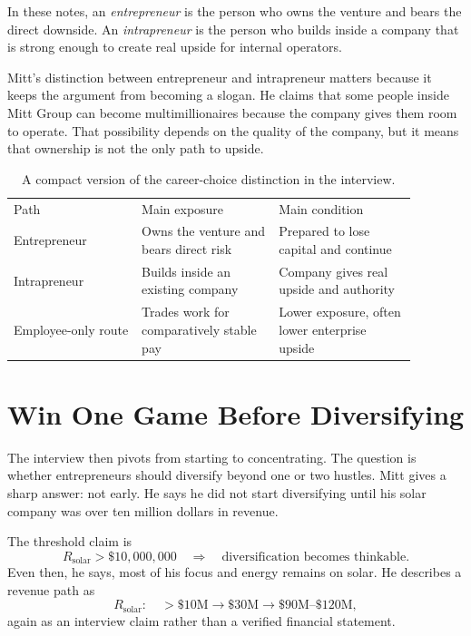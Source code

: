 \begin{definition}
In these notes, an \emph{entrepreneur} is the person who owns the venture and bears the direct downside. An \emph{intrapreneur} is the person who builds inside a company that is strong enough to create real upside for internal operators.
\end{definition}

Mitt's distinction between entrepreneur and intrapreneur matters because it keeps the argument from becoming a slogan. He claims that some people inside Mitt Group can become multimillionaires because the company gives them room to operate. That possibility depends on the quality of the company, but it means that ownership is not the only path to upside.

\begin{table}
\centering
\begin{tabular}{p{0.28\linewidth}p{0.30\linewidth}p{0.30\linewidth}}
Path & Main exposure & Main condition \\
Entrepreneur & Owns the venture and bears direct risk & Prepared to lose capital and continue \\
Intrapreneur & Builds inside an existing company & Company gives real upside and authority \\
Employee-only route & Trades work for comparatively stable pay & Lower exposure, often lower enterprise upside \\
\end{tabular}
\caption{A compact version of the career-choice distinction in the interview.}
\end{table}

\section{Win One Game Before Diversifying}

The interview then pivots from starting to concentrating. The question is whether entrepreneurs should diversify beyond one or two hustles. Mitt gives a sharp answer: not early. He says he did not start diversifying until his solar company was over ten million dollars in revenue.

The threshold claim is
\begin{equation}
R_{\text{solar}} > \$10{,}000{,}000
\quad\Longrightarrow\quad
\text{diversification becomes thinkable}.
\end{equation}
Even then, he says, most of his focus and energy remains on solar. He describes a revenue path as
\begin{equation}
R_{\text{solar}}:\quad
>\$10\text{M}\rightarrow \$30\text{M}\rightarrow \$90\text{M--}\$120\text{M},
\end{equation}
again as an interview claim rather than a verified financial statement.


